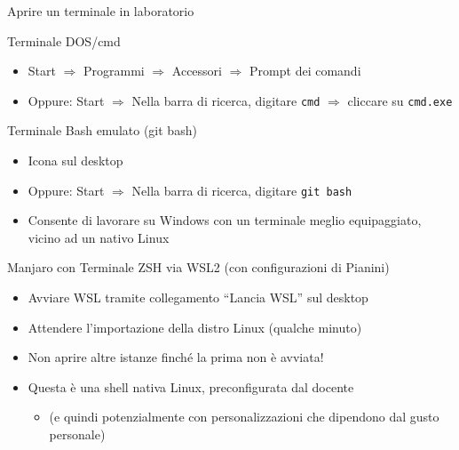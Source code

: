 \documentclass[xcolor=dvipsnames,presentation]{beamer}
\begin{document}
\begin{frame}{Aprire un terminale in laboratorio}
    \begin{block}{Terminale DOS/cmd}
        \begin{itemize}
            \item Start $\Rightarrow$ Programmi $\Rightarrow$ Accessori $\Rightarrow$ Prompt dei comandi
            \item Oppure: Start  $\Rightarrow$ Nella barra di ricerca, digitare \texttt{cmd} $\Rightarrow$ cliccare su \texttt{cmd.exe}
        \end{itemize}
    \end{block}
    \begin{block}{Terminale Bash emulato (git bash)}
        \begin{itemize}
            \item Icona sul desktop
            \item Oppure: Start  $\Rightarrow$ Nella barra di ricerca, digitare \texttt{git bash}
            \item Consente di lavorare su Windows con un terminale meglio equipaggiato, vicino ad un nativo Linux
        \end{itemize}
    \end{block}
    \begin{block}{Manjaro con Terminale ZSH via WSL2 (con configurazioni di Pianini)}
        \begin{itemize}
            \item Avviare WSL tramite collegamento ``Lancia WSL'' sul desktop
            \item Attendere l'importazione della distro Linux (qualche minuto)
            \item Non aprire altre istanze finché la prima non è avviata!
            \item Questa è una shell nativa Linux, preconfigurata dal docente
            \begin{itemize}
                \item (e quindi potenzialmente con personalizzazioni che dipendono dal gusto personale)
            \end{itemize}
        \end{itemize}
    \end{block}
\end{frame}
\end{document}
